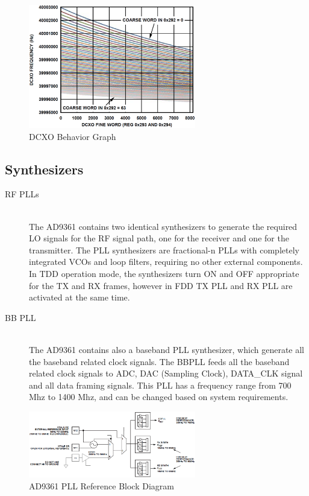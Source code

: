 \begin{figure}[htbp]
    \centering
    \includegraphics[width=0.65\textwidth]{./figures/dcxo_graph}
    \caption{ DCXO Behavior Graph
    \label{fig:pll}}
\end{figure}

\subsection{Synthesizers}

\begin{description}
	\item[RF PLLs] \hfill \\
	The AD9361 contains two identical synthesizers to generate the required LO signals for the RF signal path, one for the receiver and one for the transmitter. The PLL synthesizers are fractional-n PLLs with completely integrated VCOs and loop filters, requiring no other external components. In TDD operation mode, the synthesizers turn ON and OFF appropriate for the TX and RX frames, however in FDD TX PLL and RX PLL are activated at the same time.

	\item[BB PLL] \hfill \\
	The AD9361 contains also a baseband PLL synthesizer, which generate all the baseband related clock signals. The BBPLL feeds all the baseband related clock signals to ADC, DAC (Sampling Clock), DATA\_CLK signal and all data framing signals. This PLL has a frequency range from 700 Mhz to 1400 Mhz, and can be changed based on system requirements.

\end{description}

\begin{figure}[htbp]
    \centering
    \includegraphics[width=0.65\textwidth]{./figures/pll_ref_block}
    \caption{ AD9361 PLL Reference Block Diagram
    \label{fig:pll}}
\end{figure}

